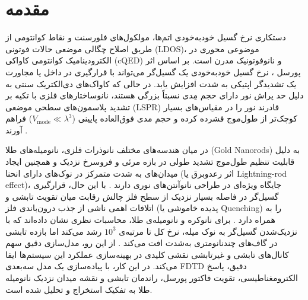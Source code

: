 \section{مقدمه}
\label{sec:intro}

دستکاری نرخ گسیل خودبه‌خودی اتم‌ها، مولکول‌های فلورسنت و نقاط کوانتومی از
طریق اصلاح چگالی موضعی حالات فوتونی (LDOS)، موضوعی محوری در الکترودینامیک
کوانتومی کاواکی (cQED) و نانوفوتونیک مدرن است. بر اساس اثر پورسل
\cite{purcell1946spontaneous}، نرخ گسیل خودبه‌خودی یک گسیل‌گر می‌تواند با
قرارگیری در داخل یا مجاورت یک تشدیدگر اپتیکی به شدت افزایش یابد. در حالی
که کاواک‌های دی‌الکتریک سنتی به دلیل حد پراش نور دارای حجم مِدی نسبتاً
بزرگی هستند، نانوساختارهای فلزی با تکیه بر تشدید پلاسمون‌های سطحی موضعی
(LSPR) قادرند نور را در مقیاس‌های بسیار کوچک‌تر از طول‌موج فشرده کرده و
حجم مدی فوق‌العاده پایینی ($V_{\text{mode}} \ll \lambda^3$) فراهم آورند
\cite[pp.~34--37]{maier2007plasmonics}.

در میان هندسه‌های مختلف نانوذرات فلزی، نانومیله‌های طلا (Gold Nanorods) به
دلیل قابلیت تنظیم طول‌موج تشدید طولی در بازه مرئی و فروسرخ نزدیک و
همچنین ایجاد میدان‌های به شدت متمرکز در نوک‌های دارای انحنا (اثر رعدوبرق
یا Lightning-rod effect)، جایگاه ویژه‌ای در طراحی نانوآنتن‌های نوری دارند
\cite{chen2009subwavelength}. با این حال، قرارگیری گسیل‌گر در فاصله بسیار
نزدیک از سطح فلز چالش رقابت میان تقویت تابشی و اتلافات اهمی ناشی از جذب
درون‌باندی فلز (پدیده خاموشی یا Quenching) را به همراه دارد
\cite{anger2006enhancement, koenderink2017single, ford1984electromagnetic}.
برای نانوکره و نانومیله‌ی طلا، محاسبات نظری نشان داده‌اند که با نزدیک‌شدن
گسیل‌گر به نوک میله، نرخ کل تا مرتبه‌ی $10^3$ رشد می‌کند اما بازده تابشی
در گاف‌های چندنانومتری به‌شدت افت می‌کند
\cite{mohammadi2008gold, kuhn2006enhancement}. از این رو، مدل‌سازی
دقیق سهم کانال‌های تابشی و غیرتابشی نقشی کلیدی در بهینه‌سازی عملکرد این
سیستم‌ها ایفا می‌کند. در این کار، با پیاده‌سازی یک مدل سه‌بعدی FDTD دقیق،
پاسخ الکترومغناطیسی، تقویت فاکتور پورسل، راندمان تابشی و نقشه میدان نزدیک
نانومیله طلا به تفکیک استخراج و تحلیل شده است.


